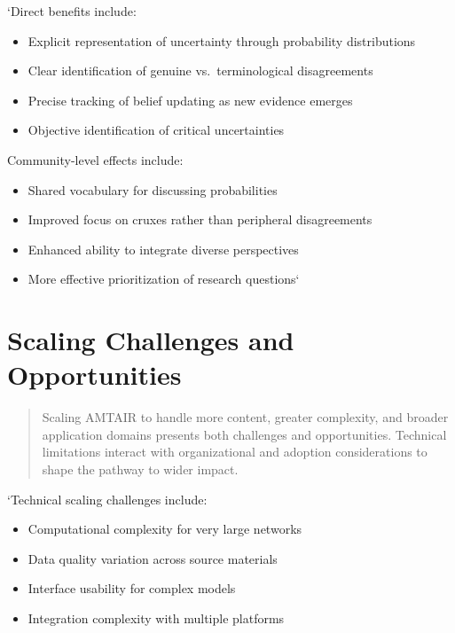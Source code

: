 \documentclass[
  11pt,
  letterpaper,
]{book}
\providecommand{\tightlist}{%
  \setlength{\itemsep}{0pt}\setlength{\parskip}{0pt}}
\begin{document}
`Direct benefits include:

\begin{itemize}
\tightlist
\item
  Explicit representation of uncertainty through probability
  distributions
\item
  Clear identification of genuine vs.~terminological disagreements
\item
  Precise tracking of belief updating as new evidence emerges
\item
  Objective identification of critical uncertainties
\end{itemize}

Community-level effects include:

\begin{itemize}
\tightlist
\item
  Shared vocabulary for discussing probabilities
\item
  Improved focus on cruxes rather than peripheral disagreements
\item
  Enhanced ability to integrate diverse perspectives
\item
  More effective prioritization of research questions`
\end{itemize}

\section{Scaling Challenges and
Opportunities}\label{sec-scaling-challenges}

\begin{quote}
Scaling AMTAIR to handle more content, greater complexity, and broader
application domains presents both challenges and opportunities.
Technical limitations interact with organizational and adoption
considerations to shape the pathway to wider impact.
\end{quote}

`Technical scaling challenges include:

\begin{itemize}
\tightlist
\item
  Computational complexity for very large networks
\item
  Data quality variation across source materials
\item
  Interface usability for complex models
\item
  Integration complexity with multiple platforms
\end{itemize}
\end{document}
